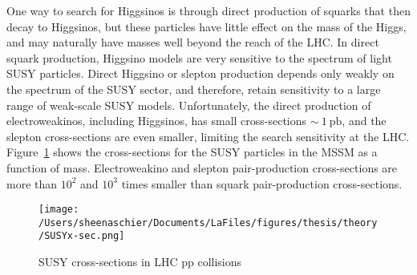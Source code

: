 One way to search for Higgsinos is through direct production of squarks that then decay to Higgsinos, but these particles have little effect on the mass of the Higgs, and may naturally have masses well beyond the reach of the LHC.  In direct squark production, Higgsino models are very sensitive to the spectrum of light SUSY particles.  Direct Higgsino or slepton production depends only weakly on the spectrum of the SUSY sector, and therefore, retain sensitivity to a large range of weak-scale SUSY models.  Unfortunately, the direct production of electroweakinos, including Higgsinos, has small cross-sections $\sim ~1~\mathrm{pb}$, and the slepton cross-sections are even smaller, limiting the search sensitivity at the LHC.  Figure~\ref{fig:thy:xsec} shows the cross-sections for the SUSY particles in the MSSM as a function of mass.  Electroweakino and slepton pair-production cross-sections are more than $10^2$ and $10^3$ times smaller than squark pair-production cross-sections.

     \begin{figure}%
  \begin{center}
  \texttt{[image: /Users/sheenaschier/Documents/LaFiles/figures/thesis/theory/SUSYx-sec.png]}
   \end{center}
 \caption{SUSY cross-sections in LHC pp collisions~\cite{Bechtle:2015nta}}
 \label{fig:thy:xsec}
 \end{figure}

